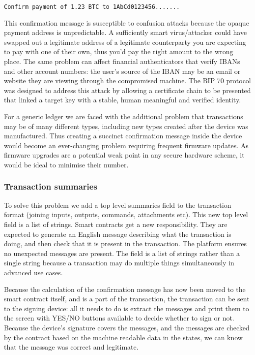 \documentclass{article}
\begin{document}
\indent\texttt{Confirm payment of 1.23 BTC to 1AbCd0123456.......}

This confirmation message is susceptible to confusion attacks because the opaque payment address is unpredictable.
A sufficiently smart virus/attacker could have swapped out a legitimate address of a legitimate counterparty you
are expecting to pay with one of their own, thus you'd pay the right amount to the wrong place. The same problem
can affect financial authenticators that verify IBANs and other account numbers: the user's source of the IBAN may
be an email or website they are viewing through the compromised machine. The BIP 70\cite{BIP70} protocol was
designed to address this attack by allowing a certificate chain to be presented that linked a target key with a
stable, human meaningful and verified identity.

For a generic ledger we are faced with the additional problem that transactions may be of many different types,
including new types created after the device was manufactured. Thus creating a succinct confirmation message inside
the device would become an ever-changing problem requiring frequent firmware updates. As firmware upgrades are a
potential weak point in any secure hardware scheme, it would be ideal to minimise their number.

\subsubsection{Transaction summaries}

To solve this problem we add a top level summaries field to the transaction format (joining inputs, outputs,
commands, attachments etc). This new top level field is a list of strings. Smart contracts get a new
responsibility. They are expected to generate an English message describing what the transaction is doing, and then
check that it is present in the transaction. The platform ensures no unexpected messages are present. The field is
a list of strings rather than a single string because a transaction may do multiple things simultaneously in
advanced use cases.

Because the calculation of the confirmation message has now been moved to the smart contract itself, and is a part
of the transaction, the transaction can be sent to the signing device: all it needs to do is extract the messages
and print them to the screen with YES/NO buttons available to decide whether to sign or not. Because the device's
signature covers the messages, and the messages are checked by the contract based on the machine readable data in
the states, we can know that the message was correct and legitimate.
\end{document}
